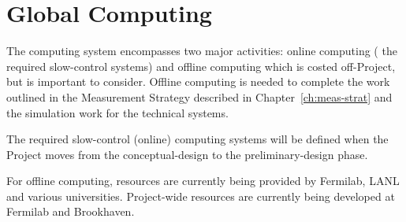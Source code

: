 \section{Global Computing}
The computing system encompasses two major activities: %
online computing (%
the required slow-control systems) and %
offline 
computing which is costed off-Project, but is important to consider.
Offline computing is needed to complete 
the work outlined in the Measurement Strategy described in Chapter~\ref{ch:meas-strat} and the simulation work %
for the technical systems.

The required slow-control (online) computing systems will be defined when the Project moves 
from the conceptual-design to the preliminary-design phase.

For offline computing, resources are currently being provided by Fermilab, 
LANL and various universities.  Project-wide resources are currently 
being developed at Fermilab and Brookhaven.
